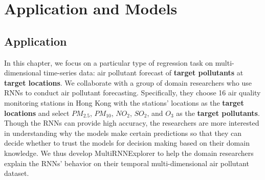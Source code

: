 \section{Application and Models}
\subsection{Application}
\label{section:application}
In this chapter, we focus on a particular type of regression task on multi-dimensional time-series data: air pollutant forecast of \textbf{target pollutants} at \textbf{target locations}.
We collaborate with a group of domain researchers who use RNNs to conduct air pollutant forecasting.
Specifically, they choose 16 air quality monitoring stations in Hong Kong with the stations' locations as the \textbf{target locations} and select $PM_{2.5}$, $PM_{10}$, $NO_{2}$, $SO_{2}$, and $O_3$ as the \textbf{target pollutants}.
Though the RNNs can provide high accuracy, the researchers are more interested in understanding why the models make certain predictions so that they can decide whether to trust the models for decision making based on their domain knowledge.
We thus develop MultiRNNExplorer to help the domain researchers explain the RNNs' behavior on their temporal multi-dimensional air pollutant dataset.







